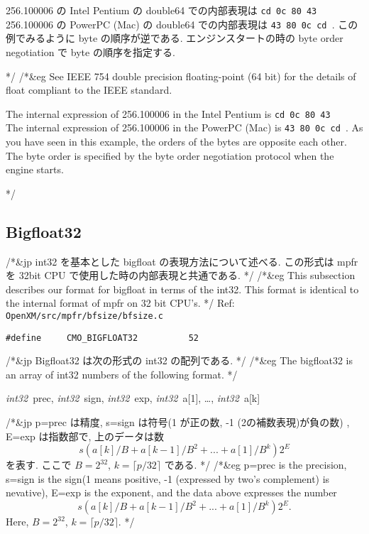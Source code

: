256.100006 の Intel Pentium の double64 での内部表現は
{\tt cd 0c 80 43 } \\
256.100006 の PowerPC (Mac) の double64 での内部表現は
{\tt 43 80 0c cd }.
この例でみるように byte の順序が逆である.
エンジンスタートの時の byte order negotiation で byte の順序を指定する.


*/
/*&eg
See IEEE 754 double precision floating-point (64 bit) for the details of 
float compliant to the IEEE standard.

The internal expression of 256.100006 in the Intel Pentium  is
{\tt cd 0c 80 43 } \\
The internal expression of 256.100006 in the PowerPC (Mac) is
{\tt 43 80 0c cd }.
As you have seen in this example,
the orders of the bytes are opposite each other.
The byte order is specified by the byte order negotiation protocol
when the engine starts.

*/

\subsection{Bigfloat32}
/*&jp
int32 を基本とした bigfloat の表現方法について述べる.
この形式は mpfr を 32bit CPU で使用した時の内部表現と共通である.
*/
/*&eg
This subsection describes our format for bigfloat in terms of the int32.
This format is identical to the internal format of mpfr on 32 bit CPU's.
*/
Ref: {\tt OpenXM/src/mpfr/bfsize/bfsize.c}

\begin{verbatim}
#define     CMO_BIGFLOAT32          52 
\end{verbatim}


/*&jp
Bigfloat32 は次の形式の int32 の配列である.
*/
/*&eg
The bigfloat32 is an array of int32 numbers of the following format.
*/

\begin{center}
{\sl int32}\, {\rm prec}, {\sl int32}\, {\rm sign}, {\sl int32}\, {\rm exp}, 
{\sl int32}\, \mbox{a[1]}, \ldots , {\sl int32}\, \mbox{a[k]}  
\end{center}

/*&jp
p=prec は精度, s=sign は符号(1 が正の数,  -1 (2の補数表現)が負の数) ,
E=exp は指数部で, 上のデータは数
$$ s (a[k]/B + a[k-1]/B^2 + ... + a[1]/B^k) 2^E  $$
を表す.
ここで $B=2^{32}$,
$k = \lceil p/32 \rceil$
である.
*/
/*&eg
p=prec is the precision, s=sign is the sign(1 means positive,  -1 (expressed by two's complement) is nevative),
E=exp is the exponent, and the data above expresses the number
$$ s (a[k]/B + a[k-1]/B^2 + ... + a[1]/B^k) 2^E.  $$
Here, $B=2^{32}$,
$k = \lceil p/32 \rceil$.
*/

